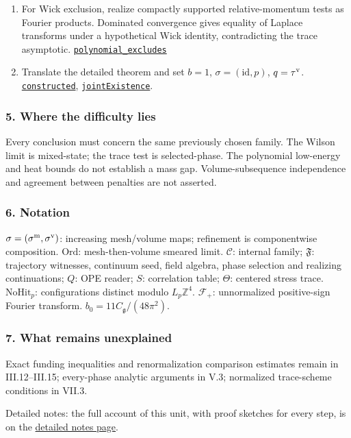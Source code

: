 \documentclass[
  letterpaper,
  11pt]{article}
\begin{document}
\begin{enumerate}
\item
  For Wick exclusion, realize compactly supported relative-momentum
  tests as Fourier products. Dominated convergence gives equality of
  Laplace transforms under a hypothetical Wick identity, contradicting
  the trace asymptotic.
  \href{https://github.com/yang-mills-group/OpenAI-YM-20261028/blob/3456e5e75cf8d4cd558955a5c7638fba2d68f464/YM/TraceExtension/Wick/Refute.lean\#L86-L105}{\texttt{polynomial\_excludes}}
\item
  Translate the detailed theorem and set \(b=1\),
  \(\sigma=(\mathrm{id},p)\), \(q=\tau^{\rm v}\).
  \href{https://github.com/yang-mills-group/OpenAI-YM-20261028/blob/3456e5e75cf8d4cd558955a5c7638fba2d68f464/Construction.lean\#L15-L40}{\texttt{constructed}},
  \href{https://github.com/yang-mills-group/OpenAI-YM-20261028/blob/3456e5e75cf8d4cd558955a5c7638fba2d68f464/Solution.lean\#L4-L10}{\texttt{jointExistence}}.
\end{enumerate}

\subsubsection{5. Where the difficulty
lies}\label{where-the-difficulty-lies-31}

Every conclusion must concern the same previously chosen family. The
Wilson limit is mixed-state; the trace test is selected-phase. The
polynomial low-energy and heat bounds do not establish a mass gap.
Volume-subsequence independence and agreement between penalties are not
asserted.

\subsubsection{6. Notation}\label{notation-31}

\(\sigma=(\sigma^{\rm m},\sigma^{\rm v})\): increasing mesh/volume maps;
refinement is componentwise composition. \(\mathrm{Ord}\):
mesh-then-volume smeared limit. \(\mathcal C\): internal family;
\(\mathfrak F\): trajectory witnesses, continuum seed, field algebra,
phase selection and realizing continuations; \(Q\): OPE reader; \(S\):
correlation table; \(\Theta\): centered stress trace.
\(\mathrm{NoHit}_p\): configurations distinct modulo \(L_p\mathbb Z^4\).
\(\mathcal F_+\): unnormalized positive-sign Fourier transform.
\(b_0=11C_{\mathfrak g}/(48\pi^2)\).

\subsubsection{7. What remains
unexplained}\label{what-remains-unexplained-31}

Exact funding inequalities and renormalization comparison estimates
remain in III.12--III.15; every-phase analytic arguments in V.3;
normalized trace-scheme conditions in VII.3.

Detailed notes: the full account of this unit, with proof sketches for
every step, is on the
\href{https://github.com/scottnarmstrong/yang-mills-informalization/blob/main/outline/notes/VIII-1.md}{detailed
notes page}.
\end{document}
